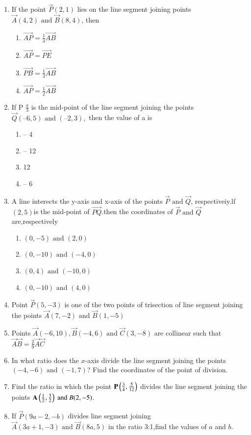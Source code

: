 \begin{enumerate}[label=\thesubsection.\arabic*,ref=\thesubsection.\theenumi]
\item If the point $\vec{P} (2, 1)$ lies on the line segment joining points$\vec{A} (4, 2) \text{ and } \vec{B} (8, 4)$,
then
\begin{enumerate}
	\item $\vec{AP} =\frac{1}{3}\vec{AB}$ 
\item $\vec{AP}=\vec{PE}$
\item $\vec{PB}=\frac{1}{3}\vec{AB}$
\item$\vec{AP}=\frac{1}{2}\vec{AB}$
 \end{enumerate}
 \item If P $\frac{a}{3}$ is the mid-point of the line segment joining the points $\vec{Q} (– 6, 5) \text{ and }(– 2, 3),$ then the value of a is
\begin{enumerate}
\item – 4
\item – 12
\item 12
\item – 6
\end{enumerate}
\item A line interects the y-axis and x-axis of the points $\vec{P} \text{ and }\vec{Q}$, respectiveiy.lf $(2,5)$is the mid-point of $\vec{PQ}$.then the coordinates of $\vec{P} \text{ and } \vec{Q}$ are,respectively
\begin{enumerate}
	\item$(0,-5)\text{ and }(2,0)$
	\item$(0,-10)\text{ and }(-4,0)$
	\item$(0,4)\text{ and } (-10,0)$
	\item$(0,-10)\text{ and }(4,0)$
\end{enumerate}
\item Point $\vec{P}(5,-3)$ is one of the two points of trisection of line segment joining the points $\vec{A}(7,-2)\text{ and }\vec{B}(1,-5)$
\item Points $\vec{A}(-6,10),\vec{B}(-4,6) \text{ and } \vec{C}(3,-8)$ are collinear such that $\vec{A}\vec{B}=  \frac{2}{9}\vec{A}\vec{C}$
\item In what ratio does the $x$-axis divide the line segment joining the points $(-4,-6)\text{ and }(-1,7)$? Find the coordinates of the point of division.
\item Find the ratio in which the point $\mathbf{P}\left(\frac{3}{4},\frac{5}{12}\right)$ divides the line segment joining the points $\mathbf{A}\left(\frac{1}{2},\frac{3}{2}\right)\text{ and }{B}(2,-5)$.
\item If $\vec{P}(9a-2,-b)$ divides line segment joining $\vec{A}(3a+1,-3)\text{ and }\vec{B}(8a,5)$ in the ratio 3:1,find the values of $a$ and $b$.

\end{enumerate}
